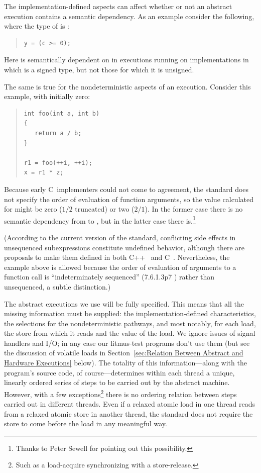 \documentclass[10]{article}
\begin{document}
The implementation-defined aspects can affect whether or not an
abstract execution contains a semantic dependency.
As an example consider the following, where the type of  is :
\begin{quote}
\begin{verbatim}
y = (c >= 0);
\end{verbatim}
\end{quote}
Here  is semantically dependent on  in executions
running on implementations in
which  is a signed type,
but not those for which it is unsigned.

The same is true for the nondeterministic aspects of an execution.
Consider this example, with  initially zero:
\begin{quote}
\begin{verbatim}
int foo(int a, int b)
{
   return a / b;
}

r1 = foo(++i, ++i);
x = r1 * z;
\end{verbatim}
\end{quote}
Because early C~implementers could not come to agreement, the standard
does not specify the order of evaluation of function arguments, so
the value calculated for  might be zero ($1/2$ truncated) or two
($2/1$).
In the former case there is no semantic dependency from  to ,
but in the latter case there is.\footnote{
	Thanks to Peter Sewell for pointing out this possibility.}

(According to the current version of the standard, conflicting side effects
in unsequenced subexpressions constitute undefined behavior,
although there are proposals to make them defined in both
C++~\cite{GabrielDosReis2016P0145r3}
and C~\cite{AlexCeleste2023N3203}.
Nevertheless, the example above is allowed because the order of evaluation
of arguments to a function call is ``indeterminately sequenced''
(7.6.1.3p7 ) rather than unsequenced, a subtle distinction.)

\medskip

The abstract executions we use will be fully specified.
This means that all the missing information must be supplied:
the implementation-defined characteristics, the selections for the
nondeterministic pathways, and most notably, for each load, the store
from which it reads and the value of the load.
We ignore issues of signal handlers and I/O;
in any case our litmus-test programs don't use them
(but see the discussion of volatile loads in
Section~\ref{sec:Relation Between Abstract and Hardware Executions} below).
The totality of this information---along with the program's source
code, of course---determines within each thread a unique, linearly
ordered series of steps to be carried out by the abstract machine.
However, with a few exceptions\footnote{
	Such as a load-acquire synchronizing with a store-release.}
there is no ordering relation between steps carried out
in different threads.
Even if a relaxed atomic load in one thread reads from a relaxed
atomic store in another thread, the standard does not require the
store to come before the load in any meaningful way.
\end{document}
